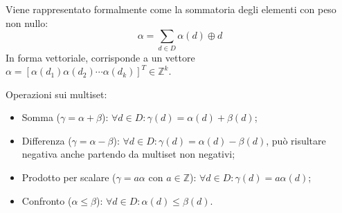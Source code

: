 Viene rappresentato formalmente come la sommatoria degli elementi con peso non nullo:
\begin{equation}
	\alpha = \sum_{d\in D} \alpha(d) \oplus d
\end{equation}
In forma vettoriale, corrisponde a un vettore $\alpha =[\alpha(d_1)\alpha(d_2)\cdots \alpha(d_k)]^T \in \mathbb{Z}^k $.\newline

\noindent Operazioni sui multiset:
\begin{itemize}
	\item Somma ($\gamma = \alpha + \beta$): $\forall d \in D: \gamma (d) = \alpha (d) + \beta(d)$;
	\item Differenza ($\gamma = \alpha - \beta$): $\forall d \in D: \gamma (d) = \alpha (d) - \beta(d)$, può risultare negativa anche partendo da multiset non negativi;
	\item Prodotto per scalare ($\gamma = a\alpha$ con $a\in \mathbb{Z}$): $\forall d \in D: \gamma (d) = a\alpha (d)$;
	\item Confronto ($\alpha \le \beta$): $\forall d \in D: \alpha (d) \le \beta(d)$.
\end{itemize}

